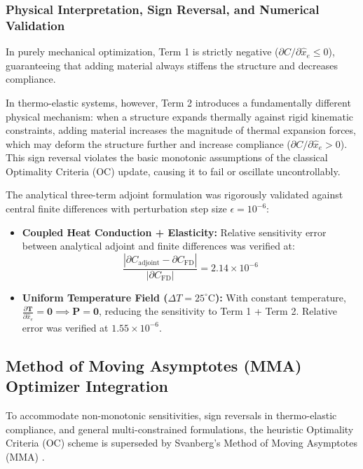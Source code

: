 \documentclass[11pt, a4paper]{article}
\begin{document}
\subsubsection{Physical Interpretation, Sign Reversal, and Numerical Validation}
In purely mechanical optimization, Term 1 is strictly negative ($\partial C / \partial \hat{x}_e \le 0$), guaranteeing that adding material always stiffens the structure and decreases compliance. 

In thermo-elastic systems, however, Term 2 introduces a fundamentally different physical mechanism: when a structure expands thermally against rigid kinematic constraints, adding material increases the magnitude of thermal expansion forces, which may deform the structure further and increase compliance ($\partial C / \partial \hat{x}_e > 0$). This sign reversal violates the basic monotonic assumptions of the classical Optimality Criteria (OC) update, causing it to fail or oscillate uncontrollably.

The analytical three-term adjoint formulation was rigorously validated against central finite differences with perturbation step size $\epsilon = 10^{-6}$:
\begin{itemize}
    \item \textbf{Coupled Heat Conduction + Elasticity:} Relative sensitivity error between analytical adjoint and finite differences was verified at:
    \begin{equation}
    \frac{|\partial C_{\text{adjoint}} - \partial C_{\text{FD}}|}{|\partial C_{\text{FD}}|} = 2.14 \times 10^{-6}
    \end{equation}
    \item \textbf{Uniform Temperature Field ($\Delta T = 25^\circ\text{C}$):} With constant temperature, $\frac{\partial \mathbf{T}}{\partial \hat{x}_e} = \mathbf{0} \implies \mathbf{P} = \mathbf{0}$, reducing the sensitivity to Term 1 + Term 2. Relative error was verified at $1.55 \times 10^{-6}$.
\end{itemize}

\subsection{Method of Moving Asymptotes (MMA) Optimizer Integration}
\label{sec:mma}
To accommodate non-monotonic sensitivities, sign reversals in thermo-elastic compliance, and general multi-constrained formulations, the heuristic Optimality Criteria (OC) scheme is superseded by Svanberg's Method of Moving Asymptotes (MMA) \cite{svanberg1987}.
\end{document}
